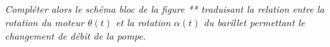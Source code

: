 \documentclass[10pt,fleqn]{article} %
\begin{document}
\begin{multicols}{2}
\begin{corrige}
\end{corrige}

\subparagraph{}
\textit{Compléter alors le schéma bloc de la figure ** traduisant la relation entre la rotation du moteur $\theta(t)$ et la rotation $\alpha(t)$ du barillet permettant le changement de débit de la pompe.}
\begin{corrige}

\end{corrige}

\end{multicols}
\end{document}
